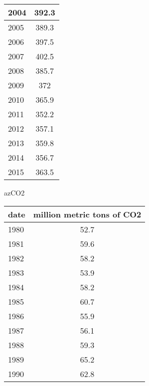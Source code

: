 \documentclass{mcmthesis}
\begin{document}
\begin{appendices}
\begin{minipage}{\textwidth}
\begin{minipage}[t]{0.45\textwidth}
\begin{tabular}{|l|c|}
        2004 & 392.3                      \\ \hline
        2005 & 389.3                      \\ \hline
        2006 & 397.5                      \\ \hline
        2007 & 402.5                      \\ \hline
        2008 & 385.7                      \\ \hline
        2009 & 372                        \\ \hline
        2010 & 365.9                      \\ \hline
        2011 & 352.2                      \\ \hline
        2012 & 357.1                      \\ \hline
        2013 & 359.8                      \\ \hline
        2014 & 356.7                      \\ \hline
        2015 & 363.5                      \\ \hline
        \end{tabular}
   \end{minipage}
   \begin{minipage}[t]{0.45\textwidth}
    \centering
         \makeatletter{}\makeatother\caption{azCO2}
         \begin{tabular}{|l|c|}
          \hline
          date & million metric tons of CO2 \\ \hline
          1980 & 52.7                       \\ \hline
          1981 & 59.6                       \\ \hline
          1982 & 58.2                       \\ \hline
          1983 & 53.9                       \\ \hline
          1984 & 58.2                       \\ \hline
          1985 & 60.7                       \\ \hline
          1986 & 55.9                       \\ \hline
          1987 & 56.1                       \\ \hline
          1988 & 59.3                       \\ \hline
          1989 & 65.2                       \\ \hline
          1990 & 62.8                       \\ \hline

\end{tabular}
\end{minipage}
\end{minipage}
\end{appendices}
\end{document}
